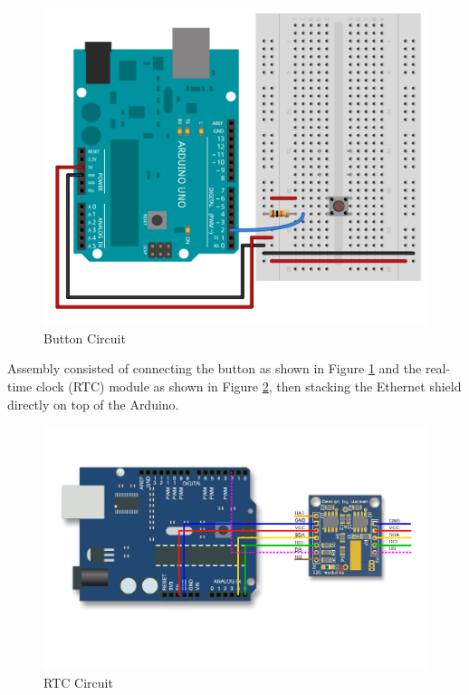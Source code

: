 \documentclass[conference]{IEEEtran}
\begin{document}
\begin{figure}[ht]
\centering
\includegraphics[width=\columnwidth]{button.png}
\caption{Button Circuit}
\label{fig:button}
\end{figure}

Assembly consisted of connecting the button as shown in Figure \ref{fig:button} and the real-time clock (RTC) module as shown in Figure \ref{fig:rtc}, then stacking the Ethernet shield directly on top of the Arduino.

\begin{figure}[ht]
\centering
\includegraphics[width=\columnwidth]{rtc.jpg}
\caption{RTC Circuit}
\label{fig:rtc}
\end{figure}
\end{document}
